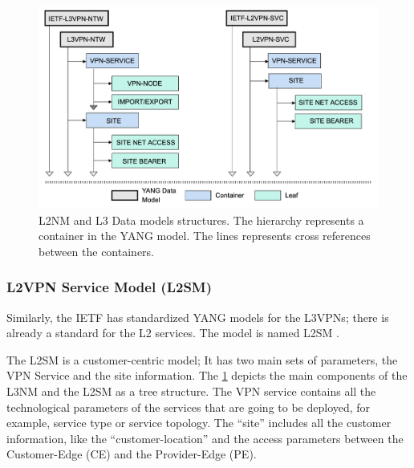 \documentclass[10pt, conference]{IEEEtran}
\begin{document}

\begin{figure}
	\centering
	\includegraphics[width=\linewidth]{figs/diagram-10.png}
	\caption{L2NM and L3 Data models structures. The hierarchy represents a container in the YANG model. The  lines represents cross references between the containers.}
	\label{FIG:l3nm} 
\end{figure}

\subsubsection{L2VPN Service Model (L2SM)}
\label{section:l2nm}

Similarly, the IETF has standardized YANG models for the L3VPNs; there is already a standard for the L2 services. The model is named L2SM \cite{wen2018yang}. 

The L2SM is a customer-centric model; It has two main sets of parameters, the VPN Service and the site information. The \cref{FIG:l3nm} depicts the main components of the L3NM and the L2SM as a tree structure. The VPN service contains all the technological parameters of the services that are going to be deployed, for example, service type or service topology. The ``site'' includes all the customer information, like the ``customer-location'' and the access parameters between the Customer-Edge (CE) and the Provider-Edge (PE).
\end{document}
